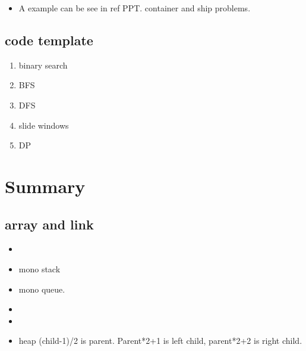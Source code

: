 \documentclass[a4paper,11pt,twoside]{book}
\begin{document}
\begin{itemize}
\item A example can be see in ref PPT.  container and ship problems. 

\end{itemize}

\section{code template}
\begin{enumerate}
	\item binary search
	\item BFS
	\item DFS
	\item slide windows
	\item DP
\end{enumerate}


\chapter{Summary}
\section{array and link}
\begin{itemize}
	\item %
	\item mono stack
	\item mono queue. 
	\item %
	
	\item %
	
	\item heap (child-1)/2 is parent.  Parent*2+1 is left child, parent*2+2 is right child.
\end{itemize}
\end{document}
